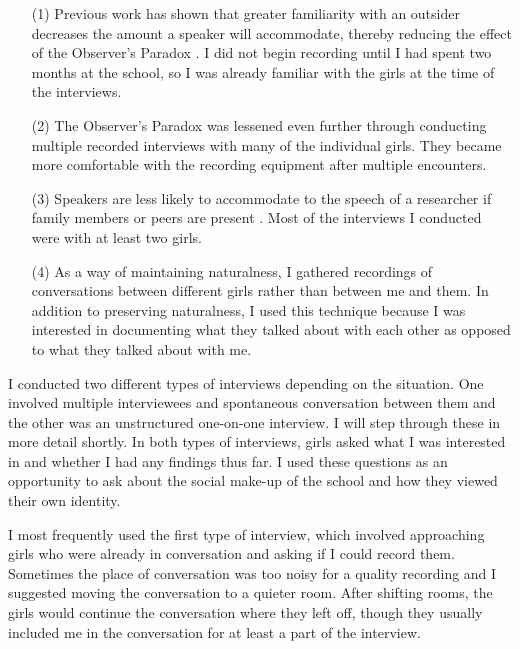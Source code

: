 \begin{enumerate}

\item[(1)] Previous work has shown that greater familiarity with an outsider decreases the amount a speaker will accommodate, thereby reducing the effect of the Observer's Paradox \citep{cukoravilabailey}. I did not begin recording until I had spent two months at the school, so I was already familiar with the girls at the time of the interviews.

\item[(2)] The Observer's Paradox was lessened even further through conducting multiple recorded interviews with many of the individual girls. They became more comfortable with the recording equipment after multiple encounters. 

\item[(3)] Speakers are less likely to accommodate to the speech of a researcher if family members or peers are present \citep[115]{labov1972principles}. Most of the interviews I conducted were with at least two girls.

\item[(4)] As a way of maintaining naturalness, I gathered recordings of conversations between different girls rather than between me and them. In addition to preserving naturalness, I used this technique because I was interested in documenting what they talked about with each other as opposed to what they talked about with me. 
\end{enumerate}

\noindent I conducted two different types of interviews depending on the situation. One involved multiple interviewees and spontaneous conversation between them and the other was an unstructured one-on-one interview. I will step through these in more detail shortly. In both types of interviews, girls asked what I was interested in and whether I had any findings thus far. I used these questions as an opportunity to ask about the social make-up of the school and how they viewed their own identity. 

I most frequently used the first type of interview, which involved approaching girls who were already in conversation and asking if I could record them. Sometimes the place of conversation was too noisy for a quality recording and I suggested moving the conversation to a quieter room. After shifting rooms, the girls would continue the conversation where they left off, though they usually included me in the conversation for at least a part of the interview.  

